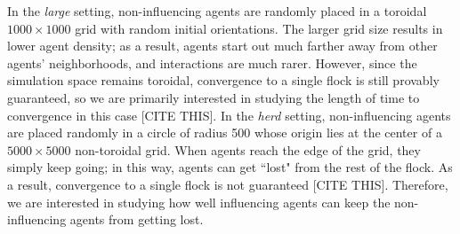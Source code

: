 In the \textit{large} setting, non-influencing agents are randomly placed in a
toroidal $1000\times1000$ grid with random initial orientations.
The larger grid size results in lower agent density; as a result, agents start
out much farther away from other agents' neighborhoods, and interactions are
much rarer.
However, since the simulation space remains toroidal, convergence to a single
flock is still provably guaranteed, so we are primarily interested in studying
the length of time to convergence in this case [CITE THIS].
In the \textit{herd} setting, non-influencing agents are placed randomly in a
circle of radius 500 whose origin lies at the center of a $5000\times5000$
non-toroidal grid.
When agents reach the edge of the grid, they simply keep going; in this way,
agents can get ``lost" from the rest of the flock.
As a result, convergence to a single flock is not guaranteed [CITE THIS].
Therefore, we are interested in studying how well influencing agents can keep
the non-influencing agents from getting lost.
